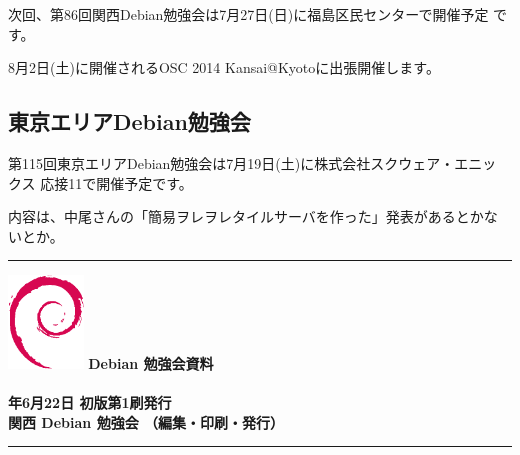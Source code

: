 \documentclass[mingoth,a4paper]{jsarticle}
\newcommand{\debmtgyear}{2014}
\newcommand{\debmtgdate}{22}
\newcommand{\debmtgmonth}{6}
\begin{document}
次回、第86回関西Debian勉強会は7月27日(日)に福島区民センターで開催予定
です。

8月2日(土)に開催されるOSC 2014 Kansai@Kyotoに出張開催します。

\subsection{東京エリアDebian勉強会}
第115回東京エリアDebian勉強会は7月19日(土)に株式会社スクウェア・エニッ
クス 応接11で開催予定です。

内容は、中尾さんの「簡易ヲレヲレタイルサーバを作った」発表があるとかな
いとか。

%
\mbox{}\newpage

\printindex

 \begin{minipage}[b]{0.2\hsize}
 \end{minipage}
 \begin{minipage}[b]{0.8\hsize}

 \vspace*{15cm}
 \rule{\hsize}{1mm}
 \vspace{2mm}
 \includegraphics[width=2cm]{image200502/openlogo-nd.eps}
 \noindent \Large \bfseries{Debian 勉強会資料}\\ \\
 \noindent \normalfont \debmtgyear{}年\debmtgmonth{}月\debmtgdate{}日 \hspace{5mm}  初版第1刷発行\\
 \noindent \normalfont 関西 Debian 勉強会 （編集・印刷・発行）\\
 \rule{\hsize}{1mm}
 \end{minipage}
\end{document}

